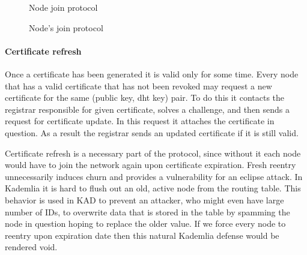 \begin{figure}
\begin{msc}{Node join protocol}
\setlength{\instdist}{5.5cm}
\setlength{\envinstdist}{3cm}
\setlength{\instwidth}{2.5cm}
\nextlevel
{}
\nextlevel[5]
\nextlevel
{}
\nextlevel[1]


\nextlevel[6]


\nextlevel


\nextlevel[2]
\nextlevel[1]
\end{msc}
\caption{Node's join protocol}
\label{fig:node_join_prot}
\end{figure}

\paragraph{Certificate refresh} Once a certificate has been generated it is
valid only for some time. Every node that has a valid certificate that has not
been revoked may request a new certificate for the same (public key, dht key)
pair. To do this it contacts the registrar responsible for given certificate,
solves a challenge, and then sends a request for certificate update. In this
request it attaches the certificate in question. As a result the registrar sends
an updated certificate if it is still valid.

Certificate refresh is a necessary part of the protocol, since without it each
node would have to join the network again upon certificate expiration.
Fresh reentry unnecessarily induces churn and provides a vulnerability for an
eclipse attack. 
In Kademlia it is hard to flush out an old, active node from the routing table.
This behavior is used in KAD to prevent an attacker, who might even have large
number of IDs, to overwrite data that is stored in the table by spamming the
node in question hoping to replace the older value. If we force every node to
reentry upon expiration date then this natural Kademlia defense would be
rendered void.


